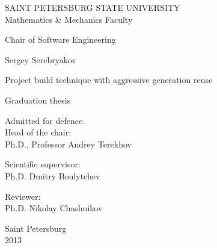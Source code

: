 %
%
\thispagestyle{empty}
\begin{center}
SAINT PETERSBURG STATE UNIVERSITY\\
Mathematics \& Mechanics Faculty\\
\end{center}

\begin{center}
Chair of Software Engineering\\
\end{center}
\vspace{2cm}
\begin{center}
    \large{Sergey Serebryakov}
\end{center}
\begin{center}
    \LARGE{Project build technique with aggressive generation reuse} \\
\end{center}
\begin{center}
    \normalsize{Graduation thesis}
\end{center}
\vspace{3cm}
\noindent
\begin{flushright}
    Admitted for defence. \\
	Head of the chair: \\
	Ph.D., Professor Andrey Terekhov
\end{flushright}
\vspace{1cm}
\begin{flushright}
	Scientific supervisor: \\
	Ph.D. Dmitry Boulytchev
\end{flushright}
\vspace{1cm}
\begin{flushright}
	Reviewer: \\
	Ph.D. Nikolay Chashnikov
\end{flushright}
\vspace{\fill}
\begin{center}
    \small
    Saint Petersburg\\2013
\end{center}
